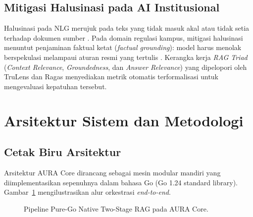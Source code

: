 \documentclass[conference]{IEEEtran}
\begin{document}
\subsection{Mitigasi Halusinasi pada AI Institusional}
Halusinasi pada NLG merujuk pada teks yang tidak masuk akal atau tidak setia terhadap dokumen sumber \cite{ji2023survey, shuster2021retrieval}. Pada domain regulasi kampus, mitigasi halusinasi menuntut penjaminan faktual ketat (\textit{factual grounding}): model harus menolak berspekulasi melampaui aturan resmi yang tertulis \cite{asai2023self}. Kerangka kerja \textit{RAG Triad} (\textit{Context Relevance}, \textit{Groundedness}, dan \textit{Answer Relevance}) yang dipelopori oleh TruLens \cite{saad2023trulens} dan Ragas \cite{es2023ragas} menyediakan metrik otomatis terformalisasi untuk mengevaluasi kepatuhan tersebut.

\section{Arsitektur Sistem dan Metodologi}

\subsection{Cetak Biru Arsitektur}
Arsitektur AURA Core dirancang sebagai mesin modular mandiri yang diimplementasikan sepenuhnya dalam bahasa Go (Go 1.24 standard library). Gambar~\ref{fig:architecture} mengilustrasikan alur orkestrasi \textit{end-to-end}.

\begin{figure}[htbp]
\centerline{}
\caption{Pipeline Pure-Go Native Two-Stage RAG pada AURA Core.}
\label{fig:architecture}
\end{figure}
\end{document}
